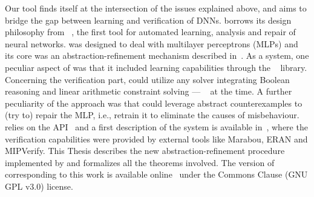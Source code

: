 Our tool \nevertwo{} finds itself at the intersection of the
issues explained above, and aims to bridge the gap between
learning and verification of DNNs. \nevertwo{} borrows its design
philosophy from \never{}~\cite{pulina2011n}, the first tool for 
automated learning, analysis and repair of neural networks. 
\never{} was designed to deal with multilayer perceptrons 
(MLPs) and its core  was an abstraction-refinement mechanism 
described in~\cite{DBLP:conf/cav/PulinaT10,DBLP:journals/aicom/PulinaT12}.  
As a system, one peculiar aspect of \never{} was that it included
learning capabilities through the \shark~\cite{igel08} library.
Concerning the verification part, \never{} could utilize any
solver integrating Boolean reasoning and linear arithmetic constraint
solving --- \hysat~\cite{franzle2007efficient} at the time.
A further peculiarity of the approach was that \never{}
could leverage abstract counterexamples to (try to) repair the
MLP, i.e., retrain it to eliminate the causes of misbehaviour.
\nevertwo{} relies on the \pynever{} API~\cite{guidotti2021pynever}
and a first description of the system is available 
in~\cite{guidotti2020never}, where the verification capabilities
were provided by external tools like Marabou, ERAN and MIPVerify.
This Thesis describes the new abstraction-refinement procedure
implemented by \nevertwo{} and formalizes all the theorems involved.
The version of \nevertwo{} corresponding to this work is available 
online~\cite{never2online} under the Commons Clause (GNU GPL v3.0) 
license.

\clearpage

